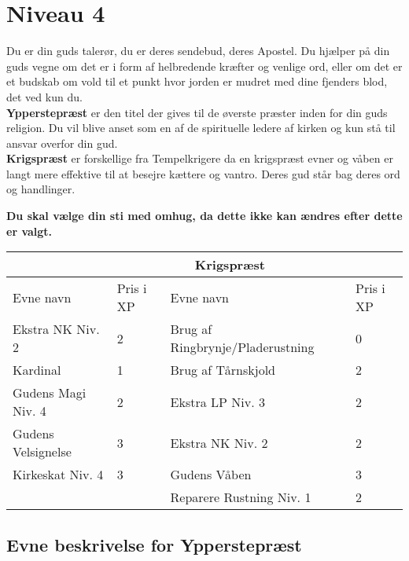 \chapter{Niveau 4}
Du er din guds talerør, du er deres sendebud, deres Apostel. Du hjælper på din guds vegne om det er i form af helbredende kræfter og venlige ord, eller om det er et budskab om vold til et punkt hvor jorden er mudret med dine fjenders blod, det ved kun du.\\
\textbf{Ypperstepræst} er den titel der gives til de øverste præster inden for din guds religion. Du vil blive anset som en af de spirituelle ledere af kirken og kun stå til ansvar overfor din gud.\\
\textbf{Krigspræst} er forskellige fra Tempelkrigere da en krigspræst evner og våben er langt mere effektive til at besejre kættere og vantro. Deres gud står bag deres ord og handlinger.

\textbf{Du skal vælge din sti med omhug, da dette ikke kan ændres efter dette er valgt.}\\


\begin{tabular}{|p{}|p{}|p{}|p{}|}
\hline
\rowcolor{cerulean!80}
 \multicolumn{2}{|c|}{ Ypperstepræst } & \multicolumn{2}{|c|}{ Krigspræst }\\
\hline
\rowcolor{cerulean!40}
    Evne navn & Pris i XP & Evne navn & Pris i XP\\ \hline
    Ekstra NK Niv. 2 & 2 & Brug af Ringbrynje/Pladerustning & 0 \\\hline
    
    Kardinal & 1 & Brug af Tårnskjold &2 \\\hline
    
    Gudens Magi Niv. 4 & 2 & Ekstra LP Niv. 3 & 2 \\\hline
    
    Gudens Velsignelse & 3 & Ekstra NK Niv. 2 & 2 \\\hline
    
    Kirkeskat Niv. 4 & 3 & Gudens Våben & 3 \\\hline 
    & & Reparere Rustning Niv. 1 & 2 \\\hline
\end{tabular}

\section{Evne beskrivelse for Ypperstepræst}

